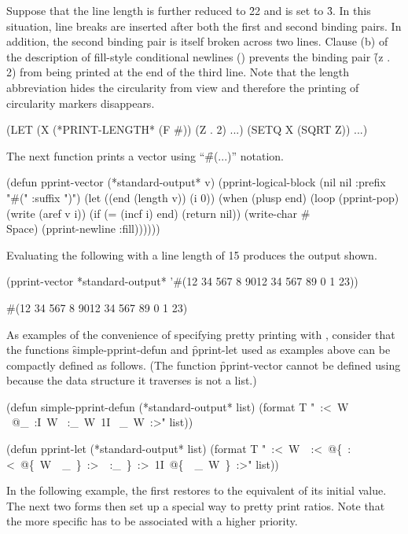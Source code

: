 Suppose that the line length is further reduced to \f{22} and  is
set to \f{3}. In this situation, line breaks are inserted after both the first
and second binding pairs.  In addition, the second binding pair is itself
broken across two lines.  Clause (b) of the description of fill-style
conditional newlines () 
prevents the binding pair \f{(z . 2)} from being printed
at the end of the third line.  Note that the length abbreviation hides the
circularity from view and therefore the printing of circularity markers
disappears.
 
\code
 (LET (X
       (*PRINT-LENGTH*
        (F #))
       (Z . 2) ...)
   (SETQ X (SQRT Z))
   ...)
\endcode
 
The next function prints a vector using ``\f{\#(...)}'' notation.
      
\code
(defun pprint-vector (*standard-output* v)
  (pprint-logical-block (nil nil :prefix "#(" :suffix ")")
    (let ((end (length v)) (i 0))
      (when (plusp end)
        (loop (pprint-pop)
              (write (aref v i))
              (if (= (incf i) end) (return nil))
              (write-char #\\Space)
              (pprint-newline :fill))))))
\endcode

Evaluating the following with a line length of 15 produces the output shown.
 
\code
 (pprint-vector *standard-output* '#(12 34 567 8 9012 34 567 89 0 1 23))
 
 #(12 34 567 8 
   9012 34 567 
   89 0 1 23)
\endcode

As examples of the convenience of specifying pretty printing with 
, consider that the functions \f{simple-pprint-defun}
and \f{pprint-let} used as examples above can be compactly defined as follows.
(The function \f{pprint-vector} cannot be defined using 
because the data structure it traverses is not a list.)
 
\code
(defun simple-pprint-defun (*standard-output* list)
  (format T "~:<~W ~@_~:I~W ~:_~W~1I ~_~W~:>" list))

(defun pprint-let (*standard-output* list)
  (format T "~:<~W~\hat ~:<~@\{~:<~@\{~W~\hat ~_~\}~:>~\hat ~:_~\}~:>~1I~@\{~\hat ~_~W~\}~:>" list)) 
\endcode

In the following example, the first  restores
 to the equivalent of its initial value.
The next two forms then set up a special way to pretty print ratios.
Note that the more specific  has to be associated
with a higher priority.
 

